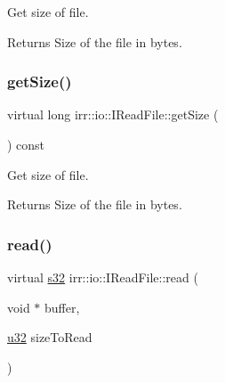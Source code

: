 Get size of file. 

\begin{DoxyReturn}{Returns}
Size of the file in bytes. 
\end{DoxyReturn}
\mbox{\label{classirr_1_1io_1_1IReadFile_a9c64fca7f1d665d7e458cd7d766c35a2}} 
\subsubsection{\texorpdfstring{get\+Size()}{getSize()}\hspace{0.1cm}{\footnotesize\ttfamily [2/2]}}
{\footnotesize\ttfamily virtual long irr\+::io\+::\+I\+Read\+File\+::get\+Size (\begin{DoxyParamCaption}{ }\end{DoxyParamCaption}) const\hspace{0.3cm}{\ttfamily [pure virtual]}}



Get size of file. 

\begin{DoxyReturn}{Returns}
Size of the file in bytes. 
\end{DoxyReturn}
\mbox{\label{classirr_1_1io_1_1IReadFile_ab51878d36bc9dd3964b664055fbeb13f}} 
\subsubsection{\texorpdfstring{read()}{read()}\hspace{0.1cm}{\footnotesize\ttfamily [1/2]}}
{\footnotesize\ttfamily virtual \hyperlink{namespaceirr_ac66849b7a6ed16e30ebede579f9b47c6}{s32} irr\+::io\+::\+I\+Read\+File\+::read (\begin{DoxyParamCaption}\item[{void $\ast$}]{buffer,  }\item[{\hyperlink{namespaceirr_a0416a53257075833e7002efd0a18e804}{u32}}]{size\+To\+Read }\end{DoxyParamCaption})\hspace{0.3cm}{\ttfamily [pure virtual]}}



